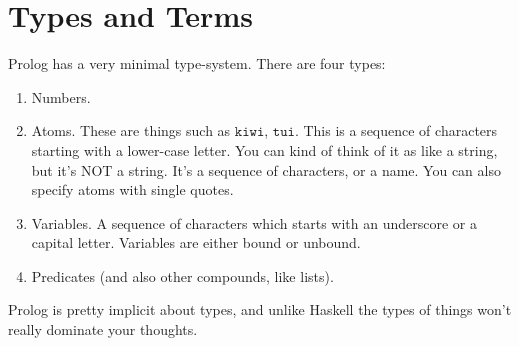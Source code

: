 \documentclass[a4paper,12pt]{article}
\newcommand{\kwa}[1]{\mathtt{#1}}
\begin{document}
\section{Types and Terms}

\noindent
Prolog has a very minimal type-system. There are four types:
\noindent
\begin{enumerate}
  \setlength{\itemsep}{0pt}
	\item Numbers.
	\item Atoms. These are things such as $\kwa{kiwi}$, $\kwa{tui}$. This is a sequence of characters starting with a lower-case letter. You can kind of think of it as like a string, but it's NOT a string. It's a sequence of characters, or a name. You can also specify atoms with single quotes.
	\item Variables. A sequence of characters which starts with an underscore or a capital letter. Variables are either bound or unbound.
	\item Predicates (and also other compounds, like lists).
\end{enumerate}

\noindent
Prolog is pretty implicit about types, and unlike Haskell the types of things won't really dominate your thoughts.
\end{document}
